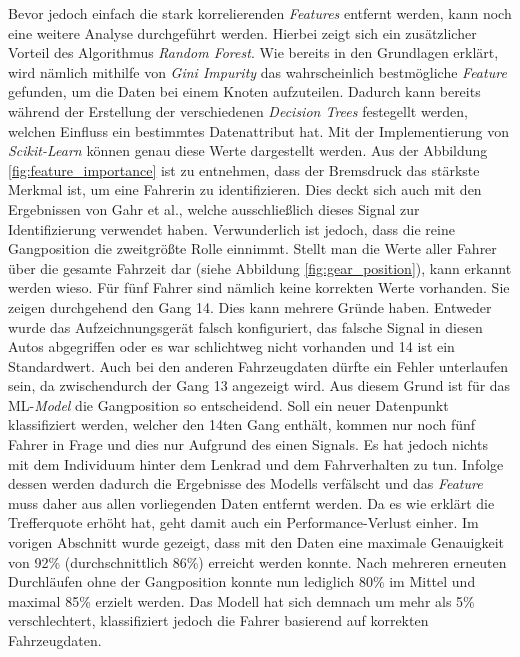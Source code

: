 Bevor jedoch einfach die stark korrelierenden \textit{Features} entfernt werden, kann noch eine weitere Analyse durchgeführt werden. Hierbei zeigt sich ein zusätzlicher Vorteil des Algorithmus \textit{Random Forest}. Wie bereits in den Grundlagen erklärt, wird nämlich mithilfe von \textit{Gini Impurity} das wahrscheinlich bestmögliche \textit{Feature} gefunden, um die Daten bei einem Knoten aufzuteilen. Dadurch kann bereits während der Erstellung der verschiedenen \textit{Decision Trees} festegellt werden, welchen Einfluss ein bestimmtes Datenattribut hat. Mit der Implementierung von \textit{Scikit-Learn} können genau diese Werte dargestellt werden. Aus der Abbildung \ref{fig:feature_importance} ist zu entnehmen, dass der Bremsdruck das stärkste Merkmal ist, um eine Fahrerin zu identifizieren. Dies deckt sich auch mit den Ergebnissen von Gahr et al., welche ausschließlich dieses Signal zur Identifizierung verwendet haben. Verwunderlich ist jedoch, dass die reine Gangposition die zweitgrößte Rolle einnimmt. Stellt man die Werte aller Fahrer über die gesamte Fahrzeit dar (siehe Abbildung \ref{fig:gear_position}), kann erkannt werden wieso. Für fünf Fahrer sind nämlich keine korrekten Werte vorhanden. Sie zeigen durchgehend den Gang 14. Dies kann mehrere Gründe haben. Entweder wurde das Aufzeichnungsgerät falsch konfiguriert, das falsche Signal in diesen Autos abgegriffen oder es war schlichtweg nicht vorhanden und 14 ist ein Standardwert. Auch bei den anderen Fahrzeugdaten dürfte ein Fehler unterlaufen sein, da zwischendurch der Gang 13 angezeigt wird. Aus diesem Grund ist für das ML-\textit{Model} die Gangposition so entscheidend. Soll ein neuer Datenpunkt klassifiziert werden, welcher den 14ten Gang enthält, kommen nur noch fünf Fahrer in Frage und dies nur Aufgrund des einen Signals. Es hat jedoch nichts mit dem Individuum hinter dem Lenkrad und dem Fahrverhalten zu tun. Infolge dessen werden dadurch die Ergebnisse des Modells verfälscht und das \textit{Feature} muss daher aus allen vorliegenden Daten entfernt werden. Da es wie erklärt die Trefferquote erhöht hat, geht damit auch ein Performance-Verlust einher. Im vorigen Abschnitt wurde gezeigt, dass mit den Daten eine maximale Genauigkeit von 92\% (durchschnittlich 86\%) erreicht werden konnte. Nach mehreren erneuten Durchläufen ohne der Gangposition konnte nun lediglich 80\% im Mittel und maximal 85\% erzielt werden. Das Modell hat sich demnach um mehr als 5\% verschlechtert, klassifiziert jedoch die Fahrer basierend auf korrekten Fahrzeugdaten.

